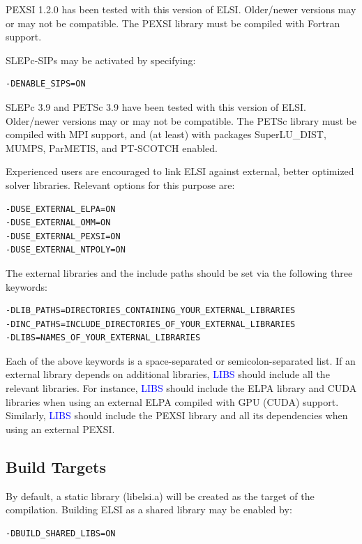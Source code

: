 \documentclass{report}
\begin{document}
PEXSI 1.2.0 has been tested with this version of ELSI.  Older/newer versions may or may not be compatible.  The PEXSI library must be compiled with Fortran support.

SLEPc-SIPs may be activated by specifying:
\begin{tcolorbox}
\begin{verbatim}
-DENABLE_SIPS=ON
\end{verbatim}
\end{tcolorbox}

SLEPc 3.9 and PETSc 3.9 have been tested with this version of ELSI.  Older/newer versions may or may not be compatible.  The PETSc library must be compiled with MPI support, and (at least) with packages SuperLU\_DIST, MUMPS, ParMETIS, and PT-SCOTCH enabled.

Experienced users are encouraged to link ELSI against external, better optimized solver libraries.  Relevant options for this purpose are:
\begin{tcolorbox}
\begin{verbatim}
-DUSE_EXTERNAL_ELPA=ON
-DUSE_EXTERNAL_OMM=ON
-DUSE_EXTERNAL_PEXSI=ON
-DUSE_EXTERNAL_NTPOLY=ON
\end{verbatim}
\end{tcolorbox}

The external libraries and the include paths should be set via the following three keywords:
\begin{tcolorbox}
\begin{verbatim}
-DLIB_PATHS=DIRECTORIES_CONTAINING_YOUR_EXTERNAL_LIBRARIES
-DINC_PATHS=INCLUDE_DIRECTORIES_OF_YOUR_EXTERNAL_LIBRARIES
-DLIBS=NAMES_OF_YOUR_EXTERNAL_LIBRARIES
\end{verbatim}
\end{tcolorbox}

Each of the above keywords is a space-separated or semicolon-separated list.  If an external library depends on additional libraries, \textcolor{blue}{LIBS} should include all the relevant libraries.  For instance, \textcolor{blue}{LIBS} should include the ELPA library and CUDA libraries when using an external ELPA compiled with GPU (CUDA) support.  Similarly, \textcolor{blue}{LIBS} should include the PEXSI library and all its dependencies when using an external PEXSI.

\subsection{Build Targets}
\label{subsec:config_targets}
By default, a static library (libelsi.a) will be created as the target of the compilation.  Building ELSI as a shared library may be enabled by:
\begin{tcolorbox}
\begin{verbatim}
-DBUILD_SHARED_LIBS=ON
\end{verbatim}
\end{tcolorbox}
\end{document}
